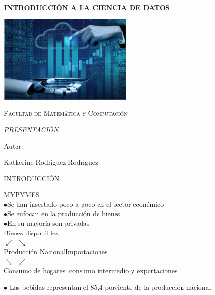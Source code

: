 \documentclass{report}
\begin{document}
    \begin{titlepage}
        \centering
        
        {\bfseries\Huge INTRODUCCIÓN A LA CIENCIA DE DATOS \par}
        \vspace{2cm}
        {\includegraphics[width= 0.5\textwidth]{CD}\par}
        \vspace{2cm}
        
        {\scshape\large Facultad de Matemática y Computación \par}
        \vspace{3cm}
        {\itshape\large PRESENTACIÓN \par}
        \vspace{3cm}
        {\large Autor: \par}
        {\large Katherine Rodríguez Rodríguez}
    \end{titlepage}
    \begin{center}
        {\underline{\large{INTRODUCCIÓN}}}\\
    \end{center}
    \vspace{2cm}
    \begin{center}
        MYPYMES\\
        $\bullet$Se han insertado poco a poco en el sector económico\\
        $\bullet$Se enfocan en la producción de bienes\\
        $\bullet$En su mayoría son privadas\\
        \vspace{2cm}
        \large{Bienes disponibles}\\
        
        $\swarrow$ \hspace{0,8cm} $\searrow$\\
        Producción Nacional\hspace{0,5cm}Importaciones\\
        $\searrow$\hspace{0,8cm} $\swarrow$\\
        Consumo de hogares, consumo intermedio y exportaciones\\
    \end{center}
    $\bullet$ Las bebidas representan el 85,4 porciento de la producción nacional
    
\end{document}
